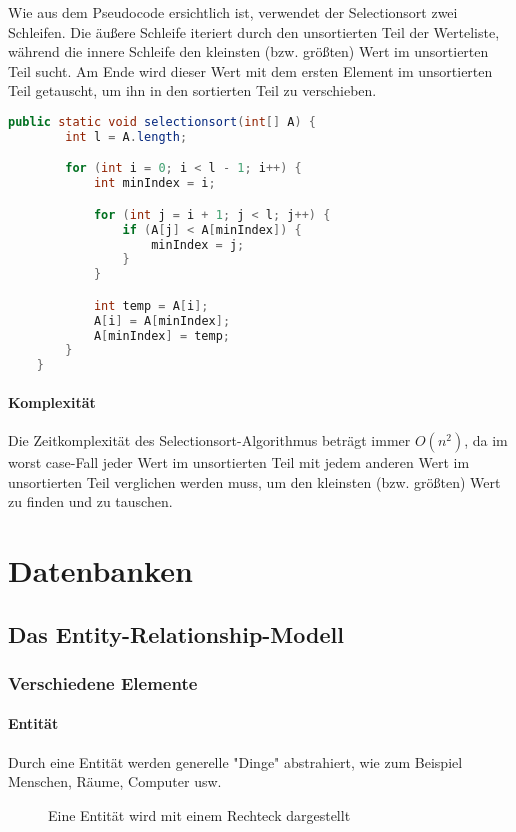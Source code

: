 \documentclass{article}
\begin{document}
	Wie aus dem Pseudocode ersichtlich ist, verwendet der Selectionsort zwei Schleifen. Die äußere Schleife iteriert durch den unsortierten Teil der Werteliste, während die innere Schleife den kleinsten (bzw. größten) Wert im unsortierten Teil sucht. Am Ende wird dieser Wert mit dem ersten Element im unsortierten Teil getauscht, um ihn in den sortierten Teil zu verschieben.

	\begin{lstlisting}[language=Java, caption=Der Selectionsort-Algorithmus in Java]
	public static void selectionsort(int[] A) {
		int l = A.length;

		for (int i = 0; i < l - 1; i++) {
			int minIndex = i;

			for (int j = i + 1; j < l; j++) {
				if (A[j] < A[minIndex]) {
					minIndex = j;
				}
			}

			int temp = A[i];
			A[i] = A[minIndex];
			A[minIndex] = temp;
		}
	}
	\end{lstlisting}

	\paragraph{Komplexität}
	Die Zeitkomplexität des Selectionsort-Algorithmus beträgt immer \textbf{$O(n^2)$}, da im worst case-Fall jeder Wert im unsortierten Teil mit jedem anderen Wert im unsortierten Teil verglichen werden muss, um den kleinsten (bzw. größten) Wert zu finden und zu tauschen.


	\section{Datenbanken}
	\subsection{Das Entity-Relationship-Modell}
	\subsubsection{Verschiedene Elemente}
	\paragraph{Entität}
	Durch eine Entität werden generelle "Dinge" abstrahiert, wie zum Beispiel Menschen, Räume, Computer usw.

	\begin{figure}[h!]
		\caption{Eine Entität wird mit einem Rechteck dargestellt}
	\end{figure}	
\end{document}
